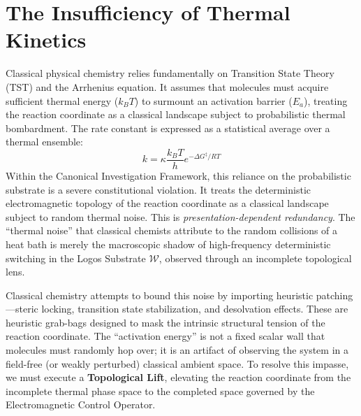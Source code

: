 \documentclass[11pt,openany]{extbook}
\theoremstyle{plain}
\theoremstyle{definition}
\begin{document}

\section{The Insufficiency of Thermal Kinetics}

Classical physical chemistry relies fundamentally on Transition State Theory (TST) and the Arrhenius equation. It assumes that molecules must acquire sufficient thermal energy ($k_B T$) to surmount an activation barrier ($E_a$), treating the reaction coordinate as a classical landscape subject to probabilistic thermal bombardment. The rate constant is expressed as a statistical average over a thermal ensemble:
\[
k = \kappa \frac{k_B T}{h} e^{-\Delta G^{\ddagger} / RT}
\]
Within the Canonical Investigation Framework, this reliance on the probabilistic substrate is a severe constitutional violation. It treats the deterministic electromagnetic topology of the reaction coordinate as a classical landscape subject to random thermal noise. This is \emph{presentation-dependent redundancy}. The ``thermal noise'' that classical chemists attribute to the random collisions of a heat bath is merely the macroscopic shadow of high-frequency deterministic switching in the Logos Substrate $\mathcal{W}$, observed through an incomplete topological lens.

Classical chemistry attempts to bound this noise by importing heuristic patching---steric locking, transition state stabilization, and desolvation effects. These are heuristic grab-bags designed to mask the intrinsic structural tension of the reaction coordinate. The ``activation energy'' is not a fixed scalar wall that molecules must randomly hop over; it is an artifact of observing the system in a field-free (or weakly perturbed) classical ambient space. To resolve this impasse, we must execute a \textbf{Topological Lift}, elevating the reaction coordinate from the incomplete thermal phase space to the completed space governed by the Electromagnetic Control Operator.
\end{document}
